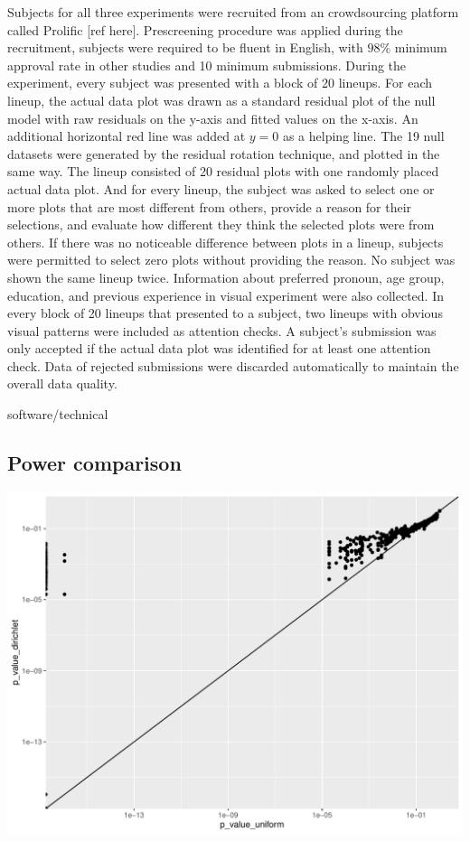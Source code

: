 \documentclass[]{interact}
\theoremstyle{plain}%
\theoremstyle{definition}
\theoremstyle{remark}
\begin{document}
Subjects for all three experiments were recruited from an crowdsourcing
platform called Prolific {[}ref here{]}. Prescreening procedure was
applied during the recruitment, subjects were required to be fluent in
English, with \(98\%\) minimum approval rate in other studies and 10
minimum submissions. During the experiment, every subject was presented
with a block of 20 lineups. For each lineup, the actual data plot was
drawn as a standard residual plot of the null model with raw residuals
on the y-axis and fitted values on the x-axis. An additional horizontal
red line was added at \(y = 0\) as a helping line. The 19 null datasets
were generated by the residual rotation technique, and plotted in the
same way. The lineup consisted of 20 residual plots with one randomly
placed actual data plot. And for every lineup, the subject was asked to
select one or more plots that are most different from others, provide a
reason for their selections, and evaluate how different they think the
selected plots were from others. If there was no noticeable difference
between plots in a lineup, subjects were permitted to select zero plots
without providing the reason. No subject was shown the same lineup
twice. Information about preferred pronoun, age group, education, and
previous experience in visual experiment were also collected. In every
block of 20 lineups that presented to a subject, two lineups with
obvious visual patterns were included as attention checks. A subject's
submission was only accepted if the actual data plot was identified for
at least one attention check. Data of rejected submissions were
discarded automatically to maintain the overall data quality.

software/technical

\hypertarget{power-comparison}{%
\subsection{Power comparison}\label{power-comparison}}

\includegraphics[width=1\linewidth]{paper_comparison_files/figure-latex/unnamed-chunk-8-1}
\end{document}
